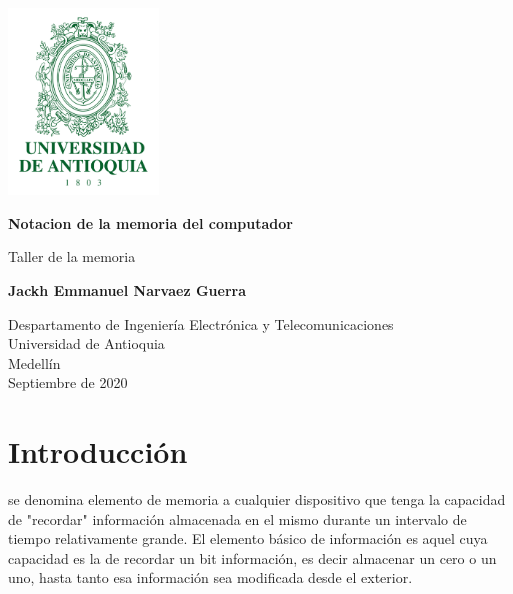 \documentclass{article}
\begin{document}
\begin{titlepage}
\renewcommand{\headrulewidth}{3pt}
\fancyhead[L]{}
\fancyhead[R]{}
    \includegraphics[width=4cm]{imagen.png}
    \begin{center}
        \vspace*{1cm} 
            
        \Huge
        \textbf{Notacion de la memoria del computador}
            
        \vspace{0.8 cm
}
        
        \LARGE
        Taller de la memoria 
            
        \vspace{1.5cm}
            
        \textbf{Jackh Emmanuel Narvaez Guerra}
            
        \vfill
            
        \vspace{0.8cm}
            
        \Large
        Despartamento de Ingeniería Electrónica y Telecomunicaciones\\
        Universidad de Antioquia\\
        Medellín\\
        Septiembre de 2020
            
    \end{center}
\end{titlepage}
\thispagestyle{fancy}

\tableofcontents

\section{Introducción}
se denomina elemento de memoria a cualquier dispositivo que tenga la capacidad de "recordar" información almacenada en el mismo durante un intervalo de tiempo relativamente grande. El elemento básico de información es aquel cuya capacidad es la de recordar un bit información, es decir almacenar un cero o un uno, hasta tanto esa información sea modificada desde el exterior.
\end{document}

